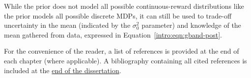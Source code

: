 While the  prior does not model all possible continuous-reward distributions like the  prior models all possible discrete MDPs, it can still be used to trade-off uncertainty in the mean (indicated by the $\sigma_0^2$ parameter) and knowledge of the mean gathered from data, expressed in Equation~\ref{intro:eqn:gband-post}.



%
\ifperchapterbib%
For the convenience of the reader, a list of references is provided at the end of each chapter (where applicable).
\ifendbib%
A bibliography containing all cited references is included at the \hyperref[sec:bibliography]{end of the dissertation}.
\else\fi%
\cbend%
\else\fi%